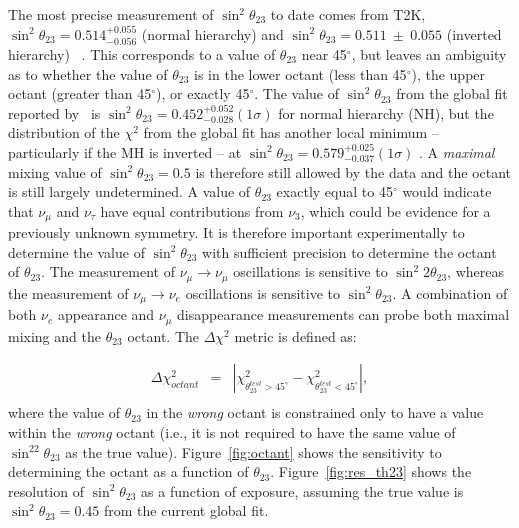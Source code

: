 The most precise measurement of $\sin^2\theta_{23}$ to date comes from T2K, $\sin^2\theta_{23} = 0.514^{+0.055}_{-0.056}$ (normal hierarchy) and $\sin^2\theta_{23} = 0.511~\pm~0.055$ (inverted hierarchy)~\cite{Abe:2015awa} .  This corresponds to a value of $\theta_{23}$ near 45\mbox{$^{\circ}$}, but leaves an ambiguity as to whether the value of $\theta_{23}$ is in the lower octant (less than 45\mbox{$^{\circ}$}), the upper octant (greater than 45\mbox{$^{\circ}$}), or exactly 45\mbox{$^{\circ}$}.  The value of $\sin^2 \theta_{23}$ from the global fit reported by~\cite{Gonzalez-Garcia:2014bfa} is $\sin ^2 \theta_{23} = 0.452
^{+0.052} _{-0.028} (1 \sigma)$ for normal hierarchy (NH), but the distribution of the $\chi^2$ from the global fit has another local minimum -- particularly if the MH is inverted -- at $\sin^2 \theta_{23} = 0.579 ^{+0.025} _{-0.037} (1 \sigma)$ . A \emph{maximal} mixing value of $\sin^2 \theta_{23} =0.5$ is therefore still allowed by the data and the octant is still largely undetermined.  A value of
$\theta_{23}$ exactly equal to 45\mbox{$^{\circ}$} would indicate that $\nu_{\mu}$ and $\nu_{\tau}$ have equal contributions from $\nu_3$, which could be evidence for a previously unknown symmetry.  It is therefore important experimentally to determine the value of $\sin ^2
\theta_{23}$ with sufficient precision to determine the octant of $\theta_{23}$.  The measurement of $\nu_\mu \rightarrow \nu_\mu$ oscillations is sensitive to $\sin ^2 2 \theta_{23}$, whereas the measurement of $\nu_\mu \rightarrow \nu_e$ oscillations is sensitive to $\sin^2 \theta_{23}$.  A combination of both $\nu_e$ appearance and $\nu_\mu$ disappearance measurements can probe both maximal mixing and
the $\theta_{23}$ octant.  The $\Delta\chi^2$ metric is defined as:

\begin{eqnarray}
\Delta\chi^2_{octant} & = & |\chi^2_{\theta_{23}^{test}>45^\circ} - \chi^2_{\theta_{23}^{test}<45^\circ}|, \\ \nonumber
\end{eqnarray}
where the value of $\theta_{23}$ in the \emph{wrong} octant is constrained 
only to have a value within the \emph{wrong} octant (i.e., it is not required
to have the same value of $\sin^22\theta_{23}$ as the true value).
Figure~\ref{fig:octant} shows the sensitivity to determining the octant as a function of $\theta_{23}$.  Figure~\ref{fig:res_th23} shows the resolution of $\sin^2\theta_{23}$ as a function of exposure, assuming the true value is $\sin^2\theta_{23} = 0.45$ from the current global fit.

